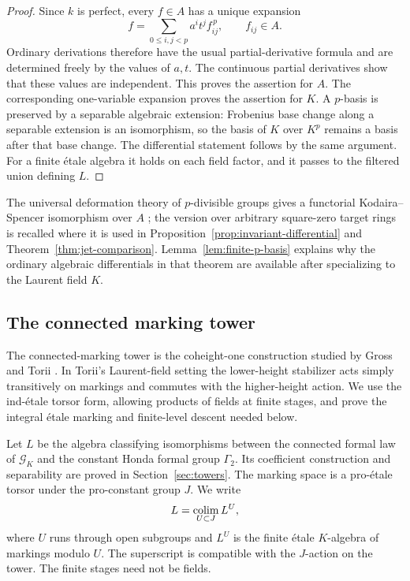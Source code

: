 \begin{proof}
Since \(k\) is perfect, every \(f\in A\) has a unique expansion
\[
          f=\sum_{0\leq i,j<p}a^it^j f_{ij}^{\,p},
          \qquad f_{ij}\in A.
\]
Ordinary derivations therefore have the usual partial-derivative
formula and are determined freely by the values of \(a,t\).
The continuous partial derivatives show that these values are
independent. This proves the assertion for \(A\).
The corresponding one-variable expansion proves the assertion for
\(K\). A \(p\)-basis is preserved by a separable algebraic extension:
Frobenius base change along a separable extension is an isomorphism,
so the basis of \(K\) over \(K^p\) remains a basis after that base
change. The differential statement follows by the same argument.
For a finite \'etale algebra it holds on each field factor, and it
passes to the filtered union defining \(L\).
\end{proof}

The universal deformation theory of \(p\)-divisible groups gives a
functorial Kodaira--Spencer isomorphism over \(A\)
\citep[Section~5]{Lau10}; the version over
arbitrary square-zero target rings is recalled where it is used in
Proposition~\ref{prop:invariant-differential} and
Theorem~\ref{thm:jet-comparison}.
Lemma~\ref{lem:finite-p-basis} explains why the ordinary algebraic
differentials in that theorem are available after specializing to
the Laurent field \(K\).

\subsection{The connected marking tower}

The connected-marking tower is the coheight-one construction studied by
Gross and Torii \citep[Theorem~3.5(1a)]{Gross79}
\citep[Section~2.3 and Theorem~2.9]{Torii03}. In Torii's Laurent-field
setting the lower-height stabilizer acts simply transitively on markings
and commutes with the higher-height action. We use the ind-\'etale torsor
form, allowing products of fields at finite stages, and prove the integral
\'etale marking and finite-level descent needed below.

Let \(L\) be the algebra classifying isomorphisms between the
connected formal law of \(\mathcal G_K\) and the constant Honda
formal group \(\Gamma_2\). Its coefficient construction and
separability are proved in Section~\ref{sec:towers}. The marking
space is a pro-\'etale torsor under the pro-constant group \(J\).
We write
\begin{equation}\label{eq:marking-algebra}
          L=\operatorname*{colim}_{U\subset J} L^U ,
\end{equation}
where \(U\) runs through open subgroups and \(L^U\) is the finite
\'etale \(K\)-algebra of markings modulo \(U\).
The superscript is compatible with the \(J\)-action on the tower.
The finite stages need not be fields.


